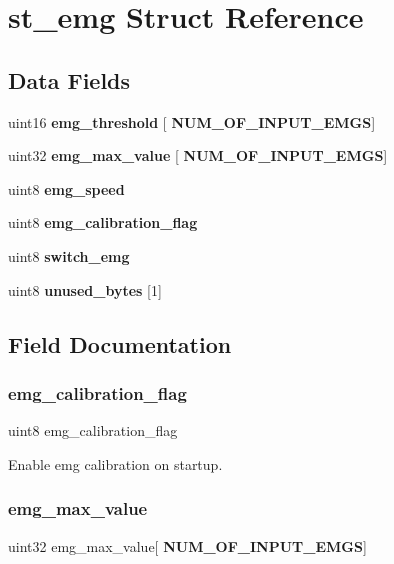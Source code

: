 \section{st\+\_\+emg Struct Reference}
\label{structst__emg}
\subsection*{Data Fields}
\begin{DoxyCompactItemize}
\item 
uint16 \textbf{ emg\+\_\+threshold} [\textbf{ N\+U\+M\+\_\+\+O\+F\+\_\+\+I\+N\+P\+U\+T\+\_\+\+E\+M\+GS}]
\item 
uint32 \textbf{ emg\+\_\+max\+\_\+value} [\textbf{ N\+U\+M\+\_\+\+O\+F\+\_\+\+I\+N\+P\+U\+T\+\_\+\+E\+M\+GS}]
\item 
uint8 \textbf{ emg\+\_\+speed}
\item 
uint8 \textbf{ emg\+\_\+calibration\+\_\+flag}
\item 
uint8 \textbf{ switch\+\_\+emg}
\item 
uint8 \textbf{ unused\+\_\+bytes} [1]
\end{DoxyCompactItemize}


\subsection{Field Documentation}
\mbox{\label{structst__emg_a78f0b0c6db2a7118cd15ec0aa38ccdb9}} 
\subsubsection{emg\+\_\+calibration\+\_\+flag}
{\footnotesize\ttfamily uint8 emg\+\_\+calibration\+\_\+flag}

Enable emg calibration on startup. \mbox{\label{structst__emg_ad35fe7496b3455cdaf034ddc2c157163}} 
\subsubsection{emg\+\_\+max\+\_\+value}
{\footnotesize\ttfamily uint32 emg\+\_\+max\+\_\+value[\textbf{ N\+U\+M\+\_\+\+O\+F\+\_\+\+I\+N\+P\+U\+T\+\_\+\+E\+M\+GS}]}

